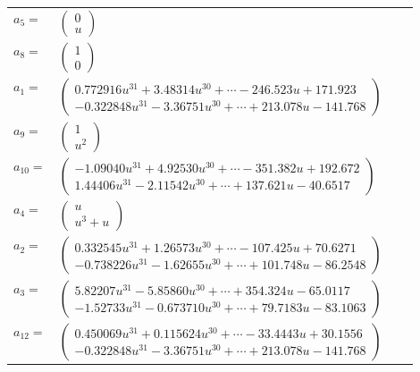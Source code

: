 \documentclass[1p]{elsarticle_modified}
\theoremstyle{definition}
\begin{document}
\begin{tabular}{m{7pt} m{180pt} m{7pt} m{180pt} }
\flushright $a_{5}=$&$\begin{pmatrix}0\\u\end{pmatrix}$ \\
\flushright $a_{8}=$&$\begin{pmatrix}1\\0\end{pmatrix}$ \\
\flushright $a_{1}=$&$\begin{pmatrix}0.772916 u^{31}+3.48314 u^{30}+\cdots-246.523 u+171.923\\-0.322848 u^{31}-3.36751 u^{30}+\cdots+213.078 u-141.768\end{pmatrix}$ \\
\flushright $a_{9}=$&$\begin{pmatrix}1\\u^2\end{pmatrix}$ \\
\flushright $a_{10}=$&$\begin{pmatrix}-1.09040 u^{31}+4.92530 u^{30}+\cdots-351.382 u+192.672\\1.44406 u^{31}-2.11542 u^{30}+\cdots+137.621 u-40.6517\end{pmatrix}$ \\
\flushright $a_{4}=$&$\begin{pmatrix}u\\u^3+u\end{pmatrix}$ \\
\flushright $a_{2}=$&$\begin{pmatrix}0.332545 u^{31}+1.26573 u^{30}+\cdots-107.425 u+70.6271\\-0.738226 u^{31}-1.62655 u^{30}+\cdots+101.748 u-86.2548\end{pmatrix}$ \\
\flushright $a_{3}=$&$\begin{pmatrix}5.82207 u^{31}-5.85860 u^{30}+\cdots+354.324 u-65.0117\\-1.52733 u^{31}-0.673710 u^{30}+\cdots+79.7183 u-83.1063\end{pmatrix}$ \\
\flushright $a_{12}=$&$\begin{pmatrix}0.450069 u^{31}+0.115624 u^{30}+\cdots-33.4443 u+30.1556\\-0.322848 u^{31}-3.36751 u^{30}+\cdots+213.078 u-141.768\end{pmatrix}$ \\

\end{tabular}
\end{document}
